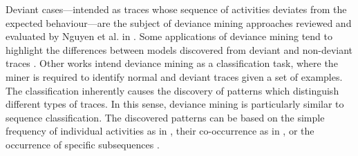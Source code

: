 Deviant cases---intended as traces whose sequence of activities deviates from the expected behaviour---are the subject of deviance mining approaches reviewed and evaluated by Nguyen et al. in \cite{2016-Nguyen}. Some applications of deviance mining tend to highlight the differences between models discovered from deviant and non-deviant traces \cite{2014-Suriadi,2014-Armas}. Other works intend deviance mining as a classification task, where the miner is required to identify normal and deviant traces given a set of examples. The classification inherently causes the discovery of patterns which distinguish different types of traces. In this sense, deviance mining is particularly similar to sequence classification. The discovered patterns can be based on the simple frequency of individual activities as in \cite{2013-Suriadi,2015-Partington}, their co-occurrence as in \cite{2011-Swinnen}, or the occurrence of specific subsequences \cite{2013-Bose,2007-Lo,2016-Bernardi}.
 
 
%
%
%
